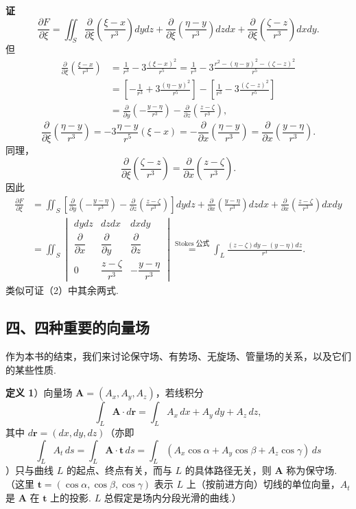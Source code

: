 \documentclass[UTF8, 12pt, fontset=fandol, oneside]{ctexart}
\providecommand{\xlongequal}[1]{\overset{#1}{=}}
\begin{document}
\noindent\textbf{证}\quad
\[
\frac{\partial F}{\partial\xi}
=\iint_S\frac{\partial}{\partial\xi}\left(\frac{\xi-x}{r^3}\right)dydz
+\frac{\partial}{\partial\xi}\left(\frac{\eta-y}{r^3}\right)dzdx
+\frac{\partial}{\partial\xi}\left(\frac{\zeta-z}{r^3}\right)dxdy. \tag{3}
\]
但
\[
\begin{aligned}
\frac{\partial}{\partial\xi}\left(\frac{\xi-x}{r^3}\right)
&=\frac1{r^3}-3\frac{(\xi-x)^2}{r^5}
=\frac1{r^3}-3\frac{r^2-(\eta-y)^2-(\zeta-z)^2}{r^5}\\
&=\left[-\frac1{r^3}+3\frac{(\eta-y)^2}{r^5}\right]
-\left[\frac1{r^3}-3\frac{(\zeta-z)^2}{r^5}\right]\\
&=\frac\partial{\partial y}\left(-\frac{y-\eta}{r^3}\right)
-\frac\partial{\partial z}\left(\frac{z-\zeta}{r^3}\right),
\end{aligned}
\]
\[
\frac{\partial}{\partial\xi}\left(\frac{\eta-y}{r^3}\right)
=-3\frac{\eta-y}{r^5}(\xi-x)
=-\frac\partial{\partial x}\left(\frac{\eta-y}{r^3}\right)
=\frac\partial{\partial x}\left(\frac{y-\eta}{r^3}\right).
\]
同理，
\[
\frac{\partial}{\partial\xi}\left(\frac{\zeta-z}{r^3}\right)=\frac\partial{\partial x}\left(\frac{z-\zeta}{r^3}\right).
\]
因此
\[
\begin{aligned}
\frac{\partial F}{\partial\xi}
&=\iint_S\left[\frac\partial{\partial y}\left(-\frac{y-\eta}{r^3}\right)-\frac\partial{\partial z}\left(\frac{z-\zeta}{r^3}\right)\right]dydz
+\frac\partial{\partial x}\left(\frac{y-\eta}{r^3}\right)dzdx
+\frac\partial{\partial x}\left(\frac{z-\zeta}{r^3}\right)dxdy\\
&=\iint_S
\begin{vmatrix}
dydz & dzdx & dxdy\\
\dfrac{\partial}{\partial x} & \dfrac{\partial}{\partial y} & \dfrac{\partial}{\partial z}\\
0 & \dfrac{z-\zeta}{r^3} & -\dfrac{y-\eta}{r^3}
\end{vmatrix}
\xlongequal{\text{Stokes 公式}}
\int_L\frac{(z-\zeta)dy-(y-\eta)dz}{r^3}.
\end{aligned}
\]
类似可证（2）中其余两式.

\subsection*{四、四种重要的向量场}

作为本书的结束，我们来讨论保守场、有势场、无旋场、管量场的关系，以及它们的某些性质.

\noindent\textbf{定义 1}）向量场 $\mathbf A=(A_x,A_y,A_z)$，若线积分
\[
\int_L\mathbf A\cdot d\mathbf r=\int_LA_x\,dx+A_y\,dy+A_z\,dz,
\]
其中 $d\mathbf r=(dx,dy,dz)$（亦即
\[
\int_LA_t\,ds=\int_L\mathbf A\cdot\mathbf t\,ds
=\int_L(A_x\cos\alpha+A_y\cos\beta+A_z\cos\gamma)\,ds
\]
）只与曲线 $L$ 的起点、终点有关，而与 $L$ 的具体路径无关，则 $\mathbf A$ 称为保守场.（这里 $\mathbf t=(\cos\alpha,\cos\beta,\cos\gamma)$ 表示 $L$ 上（按前进方向）切线的单位向量，$A_t$ 是 $\mathbf A$ 在 $\mathbf t$ 上的投影. $L$ 总假定是场内分段光滑的曲线.）
\end{document}
